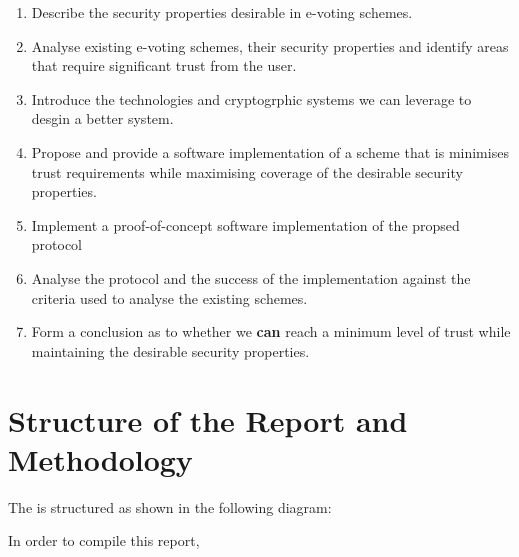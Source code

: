 \begin{enumerate}
    \item Describe the security properties desirable in e-voting schemes.
    \item Analyse existing e-voting schemes, their security properties and identify areas that require significant trust from the user.
    \item Introduce the technologies and cryptogrphic systems we can leverage to desgin a better system.
    \item Propose and provide a software implementation of a scheme that is minimises trust requirements while maximising coverage of the desirable security properties.
    \item Implement a proof-of-concept software implementation of the propsed protocol
    \item Analyse the protocol and the success of the implementation against the criteria used to analyse the existing schemes.
    \item Form a conclusion as to whether we {\textbf{can}} reach a minimum level of trust while maintaining the desirable security properties.
\end{enumerate}


\section{Structure of the Report and Methodology}
\label{ch:intro:method}

The is structured as shown in the following diagram:


In order to compile this report,

